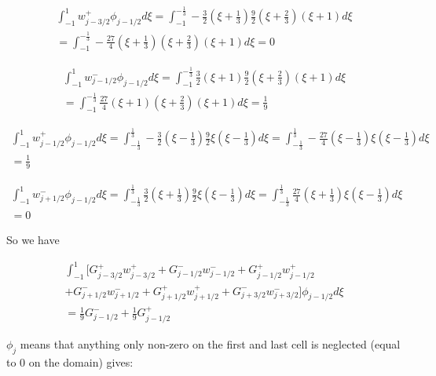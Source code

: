 \documentclass[12pt]{article}
\begin{document}
\begin{multline*}
\int_{-1}^{1}w^+_{j - 3/2}\phi_{j-1/2}  d\xi = \int_{-1}^{-\frac{1}{3}} -\frac{3}{2}\left(\xi + \frac{1}{3}\right) \frac{9}{2}\left(\xi + \frac{2}{3}\right)  \left(\xi + 1\right) d\xi \\= \int_{-1}^{-\frac{1}{3}} -\frac{27}{4}\left(\xi + \frac{1}{3}\right)\left(\xi + \frac{2}{3}\right)  \left(\xi + 1\right) d\xi = 0  
\end{multline*}

\begin{multline*}
\int_{-1}^{1}w^-_{j - 1/2}\phi_{j-1/2}  d\xi = \int_{-1}^{-\frac{1}{3}} \frac{3}{2}\left(\xi + 1\right) \frac{9}{2}\left(\xi + \frac{2}{3}\right)  \left(\xi + 1\right) d\xi \\= \int_{-1}^{-\frac{1}{3}} \frac{27}{4}\left(\xi + 1\right)\left(\xi + \frac{2}{3}\right)  \left(\xi + 1\right) d\xi = \frac{1}{9} 
\end{multline*}

\begin{multline*}
\int_{-1}^{1}w^+_{j - 1/2}\phi_{j-1/2}  d\xi = \int_{-\frac{1}{3}}^{\frac{1}{3}} -\frac{3}{2}\left(\xi - \frac{1}{3}\right) \frac{9}{2}\xi\left(\xi - \frac{1}{3}\right)  d\xi = \int_{-\frac{1}{3}}^{\frac{1}{3}} -\frac{27}{4}\left(\xi - \frac{1}{3}\right)\xi\left(\xi - \frac{1}{3}\right)  d\xi\\ = \frac{1}{9} 
\end{multline*}

\begin{multline*}
\int_{-1}^{1}w^-_{j + 1/2}\phi_{j-1/2}  d\xi = \int_{-\frac{1}{3}}^{\frac{1}{3}} \frac{3}{2}\left(\xi + \frac{1}{3}\right) \frac{9}{2}\xi\left(\xi - \frac{1}{3}\right)  d\xi = \int_{-\frac{1}{3}}^{\frac{1}{3}} \frac{27}{4}\left(\xi + \frac{1}{3}\right)\xi\left(\xi - \frac{1}{3}\right)  d\xi\\ = 0
\end{multline*}

So we have

\begin{multline*}
\int_{-1}^{1}\bigg[G^+_{j - 3/2}w^+_{j - 3/2} + G^-_{j - 1/2}w^-_{j - 1/2} + G^+_{j - 1/2}w^+_{j - 1/2} \\+ G^-_{j + 1/2}w^-_{j + 1/2} + G^+_{j + 1/2}w^+_{j + 1/2} + G^-_{j + 3/2}w^-_{j + 3/2}\bigg] \phi_{j-1/2} d\xi \\=  \frac{1}{9}G^-_{j - 1/2}  + \frac{1}{9}G^+_{j - 1/2} 
\end{multline*}

$\phi_{j}$ means that anything only non-zero on the first and last cell is neglected (equal to 0 on the domain) gives:
\end{document}
